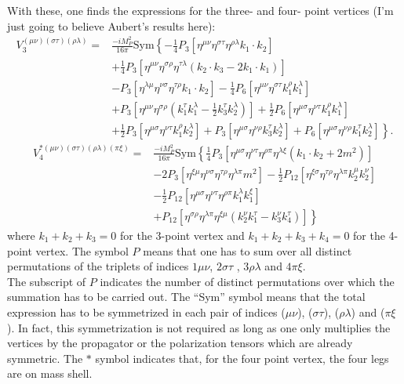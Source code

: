 \documentclass{book}
\theoremstyle{definition}
\newcommand{\nn}{\nonumber}
\newcommand{\f}[2]{\frac{#1}{#2}}
\newcommand{\lp}{\left(}
\newcommand{\rp}{\right)}
\newcommand{\lb}{\left[}
\newcommand{\rb}{\right]}
\newcommand{\lc}{\left\{}
\newcommand{\rc}{\right\}}
\begin{document}
\begin{framed}
	With these, one finds the expressions for the three- and four- point vertices (I'm just going to believe Aubert's results here):
	\begin{align}
	V_3^{(\mu\nu)(\sigma\tau)(\rho\lambda)} = &\f{-iM_P^2}{16\pi}\text{Sym}\lc -\f{1}{4}P_3\lb\eta^{\mu\nu}\eta^{\sigma\tau}\eta^{\rho\lambda}k_1 \cdot k_2\rb\right.\nn\\
	&\left.+ \f{1}{4}P_3\lb  \eta^{\mu\nu}\eta^{\sigma\rho}\eta^{\tau\lambda}(k_2\cdot k_3 - 2k_1\cdot k_1) \rb \right.\nn\\
	&\left. -P_3\lb \eta^{\lambda\mu}\eta^{\nu\sigma}\eta^{\tau\rho}k_1\cdot k_2 \rb -\f{1}{4}P_6\lb \eta^{\mu\nu}\eta^{\sigma\tau}k_1^\rho k_1^\lambda \rb\right. \nn\\
	&\left. +P_3\lb \eta^{\mu\nu}\eta^{\sigma\rho}\lp k_1^\tau k_1^\lambda - \f{1}{2}k_3^\tau k_2^\lambda \rp \rb + \f{1}{2}P_6\lb \eta^{\mu\sigma}\eta^{\nu\tau} k_1^\rho k_1^\lambda \rb\right.\nn\\
	&\left. +\f{1}{2}P_3\lb \eta^{\mu\sigma}\eta^{\nu\tau}k_1^\rho k_2^\lambda \rb + P_3\lb \eta^{\mu\sigma}\eta^{\nu\rho}k_3^\tau k_2^\lambda \rb + P_6\lb \eta^{\mu\sigma}\eta^{\nu\rho}k_1^\tau k_2^\lambda \rb  \rc.
	\end{align}
	\begin{align}
	V_4^{\ast(\mu\nu)(\sigma\tau)(\rho\lambda)(\pi\xi)} = &\f{-iM_P^2}{16\pi}\text{Sym}\lc \f{1}{4}P_3\lb \eta^{\mu\sigma}\eta^{\nu\tau}\eta^{\rho\pi}\eta^{\lambda\xi}(k_1\cdot k_2 + 2m^2) \rb \right.\nn\\
	&\left. -2P_3[\eta^{\xi\mu}\eta^{\nu\sigma}\eta^{\tau\rho}\eta^{\lambda\pi}m^2] - \f{1}{2}P_{12}\lb \eta^{\xi\sigma}\eta^{\tau\rho}\eta^{\lambda\pi}k_2^\mu k_2^\nu \rb\right.\nn\\
	&\left. - \f{1}{2}P_{12}\lb \eta^{\mu\sigma}\eta^{\nu\tau}\eta^{\rho\pi}k_1^\lambda k_1^\xi \rb \right.\nn\\
	&\left. + P_{12}\lb \eta^{\sigma\rho} \eta^{\lambda\pi} \eta^{\xi\mu} (k_2^\nu k_1^\tau - k_3^\nu k_4^\tau) \rb \rc
	\end{align}	
	where $k_1 + k_2 + k_3 = 0$ for the 3-point vertex and $k_1 + k_2 + k_3 + k_4 = 0$ for the 4-point vertex. The symbol $P$ means that one has to sum over all distinct permutations of the triplets of indices $1\mu\nu$, $2\sigma\tau$ , $3\rho\lambda$ and $4\pi\xi$. \\
	
	The subscript of $P$ indicates the number of distinct permutations over which the
	summation has to be carried out. The ``Sym'' symbol means that the total
	expression has to be symmetrized in each pair of indices ($\mu\nu$), ($\sigma\tau$), ($\rho\lambda$)
	and ($\pi\xi$). In fact, this symmetrization is not required as long as one only multiplies the vertices by the propagator or the polarization tensors which are already symmetric. The $\ast$ symbol indicates that, for the four point vertex, the four legs are on mass shell. \\
	

\end{framed}
\end{document}
